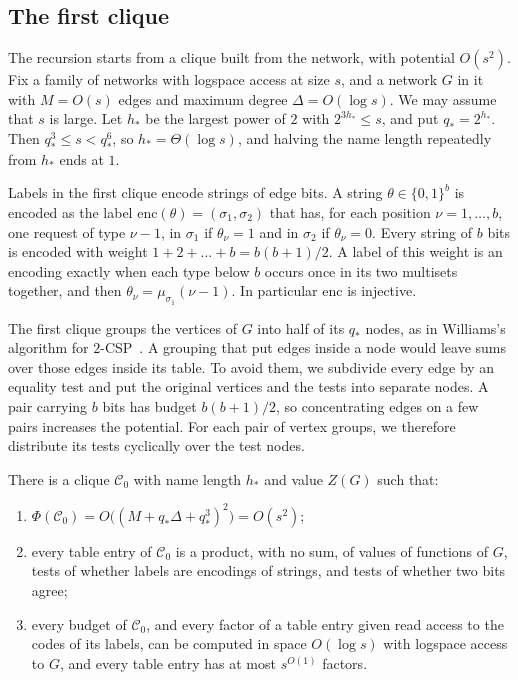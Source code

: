 \documentclass[11pt]{article}
\theoremstyle{definition}
\theoremstyle{definition}
\theoremstyle{remark}
\begin{document}
\subsection{The first clique}\label{sec:top}

The recursion starts from a clique built from the network, with potential $O(s^2)$. Fix a family of networks with logspace access at size $s$, and a network $G$ in it with $M=O(s)$ edges and maximum degree $\Delta=O(\log s)$. We may assume that $s$ is large. Let $h_*$ be the largest power of $2$ with $2^{3h_*}\le s$, and put $q_*=2^{h_*}$. Then $q_*^3\le s<q_*^6$, so $h_*=\Theta(\log s)$, and halving the name length repeatedly from $h_*$ ends at $1$.

Labels in the first clique encode strings of edge bits. A string $\theta\in\{0,1\}^b$ is encoded as the label $\mathrm{enc}(\theta)=(\sigma_1,\sigma_2)$ that has, for each position $\nu=1,\dots,b$, one request of type $\nu-1$, in $\sigma_1$ if $\theta_\nu=1$ and in $\sigma_2$ if $\theta_\nu=0$. Every string of $b$ bits is encoded with weight $1+2+\dots+b=b(b+1)/2$. A label of this weight is an encoding exactly when each type below $b$ occurs once in its two multisets together, and then $\theta_\nu=\mu_{\sigma_1}(\nu-1)$. In particular $\mathrm{enc}$ is injective.

The first clique groups the vertices of $G$ into half of its $q_*$ nodes, as in Williams's algorithm for $2$-CSP~\cite{Wil05}. A grouping that put edges inside a node would leave sums over those edges inside its table. To avoid them, we subdivide every edge by an equality test and put the original vertices and the tests into separate nodes. A pair carrying $b$ bits has budget $b(b+1)/2$, so concentrating edges on a few pairs increases the potential. For each pair of vertex groups, we therefore distribute its tests cyclically over the test nodes.

\begin{lemma}\label{lem:top}
There is a clique $\mathcal C_0$ with name length $h_*$ and value $Z(G)$ such that:
\begin{enumerate}[label=(\alph*)]
\item $\Phi(\mathcal C_0)=O\bigl((M+q_*\Delta+q_*^3)^2\bigr)=O(s^2)$;
\item every table entry of $\mathcal C_0$ is a product, with no sum, of values of functions of $G$, tests of whether labels are encodings of strings, and tests of whether two bits agree;
\item every budget of $\mathcal C_0$, and every factor of a table entry given read access to the codes of its labels, can be computed in space $O(\log s)$ with logspace access to $G$, and every table entry has at most $s^{O(1)}$ factors.
\end{enumerate}
\end{lemma}
\end{document}
